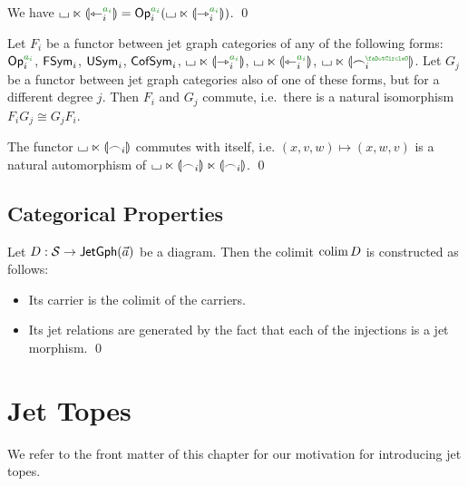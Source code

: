 \documentclass[a4paper]{memoir}
\begin{document}
\begin{corollary} \label{thm:twisted-prism-op}
	We have $\loch \multip \rival{\tej_i\pmr{a_i}} = \Op_i\pmr{a_i}(\loch \multip \rival{\jet_i\pmr{a_i}})$. \qed
\end{corollary}
\begin{corollary} \label{thm:commute-diff-degree}
	Let $F_i$ be a functor between jet graph categories of any of the following forms: $\Op_i\pmr{a_i}$, $\mathsf{FSym}_i$, $\mathsf{USym}_i$, $\mathsf{CofSym}_i$, $\loch \multip \rival{\jet_i\pmr{a_i}}$, $\loch \multip \rival{\tej_i\pmr{a_i}}$, $\loch \multip \rival{\edge_i\pmr{\npolar}}$.
	Let $G_j$ be a functor between jet graph categories also of one of these forms, but for a different degree $j$.
	Then $F_i$ and $G_j$ commute, i.e.\ there is a natural isomorphism $F_i G_j \cong G_j F_i$.
\end{corollary}
\begin{corollary} \label{thm:commute-symmetric}
The functor ${\llcorner\hspace{-.4ex}\lrcorner} \ltimes {\llparenthesis \frown_i \rrparenthesis}$ commutes with itself, i.e. $(x, v, w) \mapsto (x, w, v)$ is a natural automorphism of ${\llcorner\hspace{-.4ex}\lrcorner} \ltimes {\llparenthesis \frown_i \rrparenthesis} \ltimes {\llparenthesis \frown_i \rrparenthesis}$. \qed
\end{corollary}

\subsection{Categorical Properties} \label{sec:jetgph:cat}
\begin{proposition} \label{thm:jetgph:colim}
	Let $D : \mathcal{S} \to \mathsf{JetGph}(\vec a)$ be a diagram.
	Then the colimit $\operatorname*{colim} D$ is constructed as follows:
	\begin{itemize}
		\item Its carrier is the colimit of the carriers.
		\item Its jet relations are generated by the fact that each of the injections is a jet morphism. \qed
	\end{itemize}
\end{proposition}

\section{Jet Topes} \label{sec:jettope}
We refer to the front matter of this chapter for our motivation for introducing jet topes.
\end{document}

